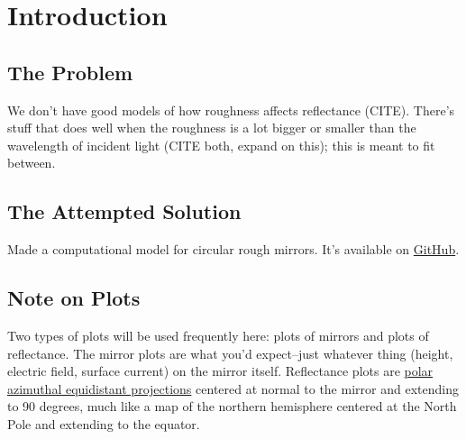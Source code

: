 \documentclass[etd,twoside,senior]{BYUPhys}
\begin{document}
\frontmatter

\makepreliminarypages

\tableofcontents

\mainmatter






\chapter{Introduction} \label{chap:intro}

\section{The Problem} \label{sec:problem}

We don't have good models of how roughness affects reflectance (CITE). There's stuff that does well when the roughness is a lot bigger or smaller than the wavelength of incident light (CITE both, expand on this); this is meant to fit between.



\section{The Attempted Solution} \label{sec:attempted_solution}

Made a computational model for circular rough mirrors. It's available on \href{https://github.com/mjg0/Mirrors.jl}{GitHub}.



\section{Note on Plots} \label{sec:plots_note}

Two types of plots will be used frequently here: plots of mirrors and plots of reflectance. The mirror plots are what you'd expect--just whatever thing (height, electric field, surface current) on the mirror itself. Reflectance plots are \href{https://en.wikipedia.org/wiki/Azimuthal_equidistant_projection}{polar azimuthal equidistant projections} centered at normal to the mirror and extending to 90 degrees, much like a map of the northern hemisphere centered at the North Pole and extending to the equator.
\end{document}
